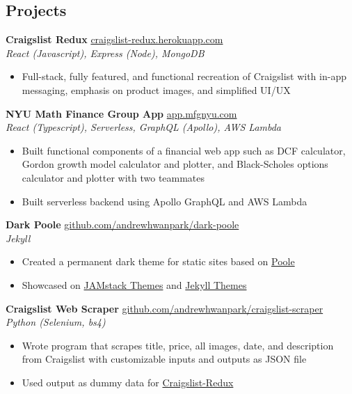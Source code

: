 \documentclass[margin]{res}
\begin{document}
\begin{resume}
	\section{Projects} 
	{\bf Craigslist Redux} \hfill \href{http://craigslist-redux.herokuapp.com}{craigslist-redux.herokuapp.com}\\
	{\it React (Javascript), Express (Node), MongoDB}
	\begin{itemize} \itemsep -2pt
		\item Full-stack, fully featured, and functional recreation of Craigslist with in-app messaging, emphasis on product images, and simplified UI/UX
	\end{itemize}
	
	{\bf NYU Math Finance Group App} \hfill\href{https://github.com/mfg-nyu/app}{app.mfgnyu.com}\\
	{\it React (Typescript), Serverless, GraphQL (Apollo), AWS Lambda}
	\begin{itemize} \itemsep -2pt
		\item Built functional components of a financial web app such as DCF calculator, Gordon growth model calculator and plotter, and Black-Scholes options calculator and plotter with two teammates
		\item Built serverless backend using Apollo GraphQL and AWS Lambda
	\end{itemize}
	
	{\bf Dark Poole} \hfill \href{https://github.com/andrewhwanpark/dark-poole}{github.com/andrewhwanpark/dark-poole}\\
	{\it Jekyll}
	\begin{itemize} \itemsep -2pt
		\item Created a permanent dark theme for static sites based on \href{https://github.com/poole/poole}{Poole}
		\item Showcased on \href{https://jamstackthemes.dev/theme/dark-poole/}{JAMstack Themes} and \href{https://jekyll-themes.com/dark-poole/}{Jekyll Themes}
	\end{itemize}
	
	{\bf Craigslist Web Scraper} \hfill \href{https://github.com/andrewhwanpark/craigslist-scraper}{github.com/andrewhwanpark/craigslist-scraper}\\
	{\it Python (Selenium, bs4)}
	\begin{itemize} \itemsep -2pt
		\item Wrote program that scrapes title, price, all images, date, and description from Craigslist with customizable inputs and outputs as JSON file
		\item Used output as dummy data for \href{https://github.com/andrewhwanpark/craigslist-redux}{Craigslist-Redux}
	\end{itemize}
	

\end{resume}
\end{document}
